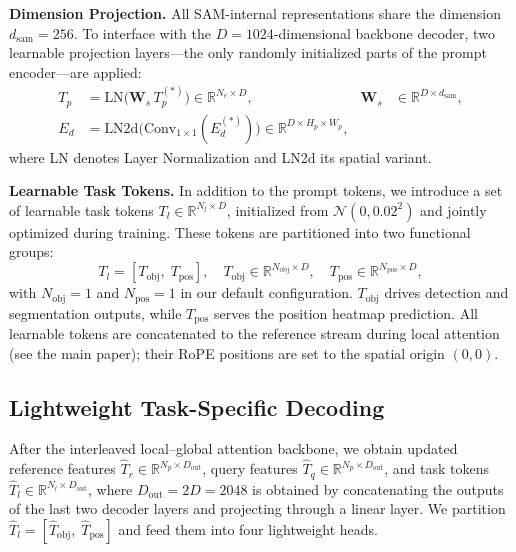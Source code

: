 \noindent\textbf{Dimension Projection.}
All SAM-internal representations share the dimension $d_\text{sam}=256$.
To interface with the $D=1024$-dimensional backbone decoder, two learnable projection layers—the only randomly initialized parts of the prompt encoder—are applied:
\begin{align}
  T_p &= \text{LN}\!\bigl(\mathbf{W}_s\, T_p^{(*)}\bigr)
       \in \mathbb{R}^{N_e\times D},
       &\mathbf{W}_s &\in\mathbb{R}^{D\times d_\text{sam}},
       \label{eq:sparse_proj}\\
  E_d &= \text{LN2d}\!\bigl(\text{Conv}_{1\times1}(E_d^{(*)})\bigr)
       \in \mathbb{R}^{D\times H_p\times W_p},
       \label{eq:dense_proj}
\end{align}
where LN denotes Layer Normalization and LN2d its spatial variant.

\noindent\textbf{Learnable Task Tokens.}
In addition to the prompt tokens, we introduce a set of learnable task tokens $T_l\in\mathbb{R}^{N_l\times D}$, initialized from $\mathcal{N}(0, 0.02^2)$ and jointly optimized during training. These tokens are partitioned into two functional groups:
\begin{equation}
  T_l = [T_\text{obj},\; T_\text{pos}],\quad
  T_\text{obj}\in\mathbb{R}^{N_\text{obj}\times D},\quad
  T_\text{pos}\in\mathbb{R}^{N_\text{pos}\times D},
\end{equation}
with $N_\text{obj}=1$ and $N_\text{pos}=1$ in our default configuration.
$T_\text{obj}$ drives detection and segmentation outputs, while $T_\text{pos}$ serves the position heatmap prediction. All learnable tokens are concatenated to the reference stream during local attention (see the main paper); their RoPE positions are set to the spatial origin $(0,0)$.


\subsection{Lightweight Task-Specific Decoding}
\label{sec:supp_dec}

After the interleaved local--global attention backbone, we obtain updated
reference features $\hat{T}_r\in\mathbb{R}^{N_p\times D_\text{out}}$,
query features $\hat{T}_q\in\mathbb{R}^{N_p\times D_\text{out}}$,
and task tokens $\hat{T}_l\in\mathbb{R}^{N_l\times D_\text{out}}$,
where $D_\text{out}=2D=2048$ is obtained by concatenating the outputs of
the last two decoder layers and projecting through a linear layer.
We partition $\hat{T}_l = [\hat{T}_\text{obj},\;\hat{T}_\text{pos}]$ and
feed them into four lightweight heads.

